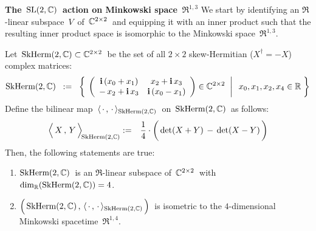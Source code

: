 

\vskip 1.0cm
\noindent
\textbf{\large The \,$\textnormal{SL}(2,\mathbb{C})$\, action on Minkowski space \,$\Re^{1,3}$}
\vskip 0.3cm
\noindent
We start by identifying an $\Re$-linear subspace \,$V$\, of \,$\mathbb{C}^{2 \times 2}$\, 
and equipping it with an inner product such that the resulting inner product space
is isomorphic to the Minkowski space \,$\Re^{1,3}$.\,

\vskip 0.2cm
\noindent
\begin{proposition}
\mbox{}
\vskip 0.1cm
\noindent
Let \,$\textnormal{SkHerm}(2,\mathbb{C}) \subset \mathbb{C}^{2 \times 2}$\, be the set of all $2 \times 2$ skew-Hermitian ($X^{\dagger} = -X$) complex matrices:
\begin{equation*}
\textnormal{SkHerm}(2,\mathbb{C})
\;\; := \;\;
	\left\{\;
		\left.\left(\begin{array}{cc}
			\textnormal{\bf i}\,(x_{0}+x_{1}) & x_{2}+\textnormal{\bf i}\,x_{3}
			\\
			-\,x_{2}+\textnormal{\bf i}\,x_{3} & \textnormal{\bf i}\,(x_{0}-x_{1})
			\end{array}\right)
		\in
		\mathbb{C}^{2 \times 2}
		\;\;\right\vert\;\;
		x_{0}, x_{1}, x_{2}, x_{4} \in \mathbb{R}
		\;\right\}
\end{equation*}
Define the bilinear map \,$\langle\,\cdot\,,\,\cdot\,\rangle_{\textnormal{SkHerm}(2,\mathbb{C})}$\, on \,$\textnormal{SkHerm}(2,\mathbb{C})$\, as follows:
\begin{eqnarray*}
\left\langle\,
	\overset{{\color{white}.}}{X}
	\, , \,
	Y
	\,\right\rangle_{\!\SkHermTwoC}
& := &
	\dfrac{1}{4}\cdot\left(\,
		\det(X + Y)
		\, \overset{{\color{white}1}}{-} \,
		\det(X - Y)
		\,\right)
\end{eqnarray*}
Then, the following statements are true:
\begin{enumerate}
\item
	$\textnormal{SkHerm}(2,\mathbb{C})$\, is an $\Re$-linear subspace of \,$\mathbb{C}^{2 \times 2}$\, with \,$\dim_{\mathbb{R}}(\textnormal{SkHerm}(2,\mathbb{C})) = 4$.\,
\item
	$\left(\,\overset{{\color{white}.}}{\SkHermTwoC}\,,\,\langle\,\cdot\,,\,\cdot\,\rangle_{\SkHermTwoC}\,\right)$\,
	is isometric to the $4$-dimensional Minkowski spacetime \,$\Re^{1,4}$.\,
\end{enumerate}
\end{proposition}
\proof
